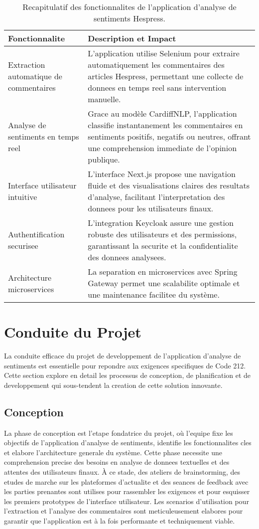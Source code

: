 \begin{table}[h!]
\centering
\begin{tabular}{|p{6cm}|p{10cm}|}
\hline
\textbf{Fonctionnalite} & \textbf{Description et Impact} \\ \hline
Extraction automatique de commentaires & L'application utilise Selenium pour extraire automatiquement les commentaires des articles Hespress, permettant une collecte de donnees en temps reel sans intervention manuelle. \\ \hline
Analyse de sentiments en temps reel & Grace au modèle CardiffNLP, l'application classifie instantanement les commentaires en sentiments positifs, negatifs ou neutres, offrant une comprehension immediate de l'opinion publique. \\ \hline
Interface utilisateur intuitive & L'interface Next.js propose une navigation fluide et des visualisations claires des resultats d'analyse, facilitant l'interpretation des donnees pour les utilisateurs finaux. \\ \hline
Authentification securisee & L'integration Keycloak assure une gestion robuste des utilisateurs et des permissions, garantissant la securite et la confidentialite des donnees analysees. \\ \hline
Architecture microservices & La separation en microservices avec Spring Gateway permet une scalabilite optimale et une maintenance facilitee du système. \\ \hline
\end{tabular}
\caption{Recapitulatif des fonctionnalites de l'application d'analyse de sentiments Hespress.}
\label{tab:sentimentfeatures}
\end{table}

\section{Conduite du Projet}
La conduite efficace du projet de developpement de l'application d'analyse de sentiments est essentielle pour repondre aux exigences specifiques de Code 212. Cette section explore en detail les processus de conception, de planification et de developpement qui sous-tendent la creation de cette solution innovante.

\subsection{Conception}
La phase de conception est l'etape fondatrice du projet, où l'equipe fixe les objectifs de l'application d'analyse de sentiments, identifie les fonctionnalites cles et elabore l'architecture generale du système. Cette phase necessite une comprehension precise des besoins en analyse de donnees textuelles et des attentes des utilisateurs finaux. À ce stade, des ateliers de brainstorming, des etudes de marche sur les plateformes d'actualite et des seances de feedback avec les parties prenantes sont utilises pour rassembler les exigences et pour esquisser les premiers prototypes de l'interface utilisateur. Les scenarios d'utilisation pour l'extraction et l'analyse des commentaires sont meticuleusement elabores pour garantir que l'application est à la fois performante et techniquement viable.

